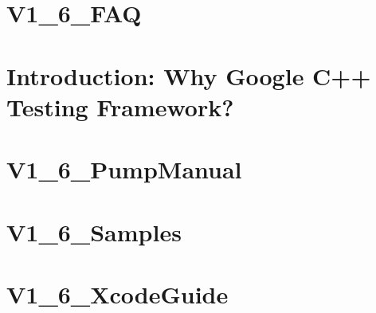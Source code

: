 \documentclass[twoside]{book}
\newcommand{\+}{\discretionary{\mbox{\scriptsize$\hookleftarrow$}}{}{}}
\begin{document}
\chapter{V1\+\_\+6\+\_\+\+F\+AQ}
\label{md_smacc_sm_reference_library_sm_panda_moveit_libfranka_3rdparty_googletest_googletest_docs_V1_6_FAQ}

\chapter{Introduction\+: Why Google C++ Testing Framework?}
\label{md_smacc_sm_reference_library_sm_panda_moveit_libfranka_3rdparty_googletest_googletest_docs_V1_6_Primer}

\chapter{V1\+\_\+6\+\_\+\+Pump\+Manual}
\label{md_smacc_sm_reference_library_sm_panda_moveit_libfranka_3rdparty_googletest_googletest_docs_V1_6_PumpManual}

\chapter{V1\+\_\+6\+\_\+\+Samples}
\label{md_smacc_sm_reference_library_sm_panda_moveit_libfranka_3rdparty_googletest_googletest_docs_V1_6_Samples}

\chapter{V1\+\_\+6\+\_\+\+Xcode\+Guide}
\label{md_smacc_sm_reference_library_sm_panda_moveit_libfranka_3rdparty_googletest_googletest_docs_V1_6_XcodeGuide}

\end{document}
